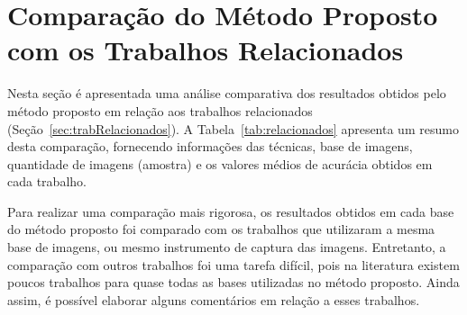 
\section{Comparação do Método Proposto com os Trabalhos Relacionados}
\label{sec:comparacao}

Nesta seção é apresentada uma análise comparativa dos resultados obtidos pelo método proposto em relação aos trabalhos relacionados (Seção~\ref{sec:trabRelacionados}). A Tabela~\ref{tab:relacionados} apresenta um resumo desta comparação, fornecendo informações das técnicas, base de imagens, quantidade de imagens (amostra) e os valores médios de acurácia obtidos em cada trabalho.

Para realizar uma comparação mais rigorosa, os resultados obtidos em cada base do método proposto foi comparado com os trabalhos que utilizaram a mesma base de imagens, ou mesmo instrumento de captura das imagens. Entretanto, a comparação com outros trabalhos foi uma tarefa difícil, pois na literatura existem poucos trabalhos para quase todas as bases utilizadas no método proposto. Ainda assim, é possível elaborar alguns comentários em relação a esses trabalhos.

